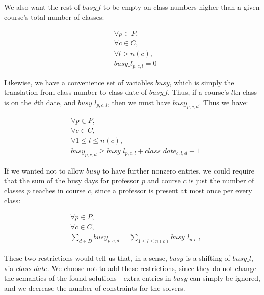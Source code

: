 We also want the rest of $busy\_l$ to be empty on class numbers higher than a given course's total number of classes:

\begin{align}
  &\forall p \in P,\\
  &\forall c \in C,\\
  &\forall l > n(c),\\
  &busy\_l_{p, c, l} = 0
\end{align}

Likewise, we have a convenience set of variables $busy$, which is simply the translation from class number to class date of $busy\_l$. Thus, if a course's $l$th class is on the $d$th date, and $busy\_l_{p, c, l}$, then we must have $busy_{p, c, d}$. Thus we have:

\begin{align}
  &\forall p \in P,\\
  &\forall c \in C,\\
  &\forall 1 \le l \le n(c),\\
  &busy_{p, c, d} \ge busy\_l_{p, c, l} + class\_date_{c, l, d} - 1
\end{align}

If we wanted not to allow $busy$ to have further nonzero entries, we could require that the sum of the busy days for professor $p$ and course $c$ is just the number of classes $p$ teaches in course $c$, since a professor is present at most once per every class:

\begin{align}
  &\forall p \in P,\\
  &\forall c \in C,\\
  &\sum_{d \in D} busy_{p, c, d} = \sum_{1 \le l \le n(c)} busy\_l_{p, c, l}
\end{align}

These two restrictions would tell us that, in a sense, $busy$ is a shifting of $busy\_l$, via $class\_date$. We choose not to add these restrictions, since they do not change the semantics of the found solutions - extra entries in $busy$ can simply be ignored, and we decrease the number of constraints for the solvers.
